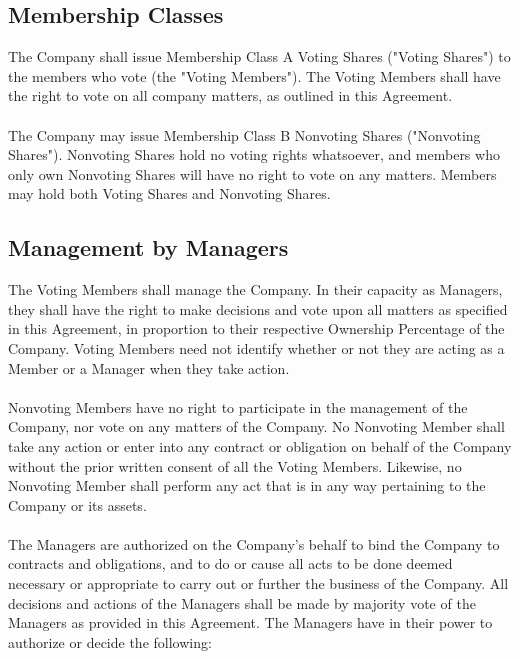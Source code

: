 \documentclass[11pt]{article}
\begin{document}
\subsection{Membership Classes}
\label{sec:membershipClasses}
The Company shall issue Membership Class A Voting Shares ("Voting Shares") to the members who vote (the "Voting Members"). The Voting Members shall have the right to vote on all company matters, as outlined in this Agreement.\\\\
The Company may issue Membership Class B Nonvoting Shares ("Nonvoting Shares"). Nonvoting Shares hold no voting rights whatsoever, and members who only own Nonvoting Shares will have no right to vote on any matters. Members may hold both Voting Shares and Nonvoting Shares.

\subsection{Management by Managers}
The Voting Members shall manage the Company. In their capacity as Managers, they shall have the right to make decisions and vote upon all matters as specified in this Agreement, in proportion to their respective Ownership Percentage of the Company. Voting Members need not identify whether or not they are acting as a Member or a Manager when they take action.\\\\
Nonvoting Members have no right to participate in the management of the Company, nor vote on any matters of the Company. No Nonvoting Member shall take any action or enter into any contract or obligation on behalf of the Company without the prior written consent of all the Voting Members. Likewise, no Nonvoting Member shall perform any act that is in any way pertaining to the Company or its assets.\\\\
The Managers are authorized on the Company's behalf to bind the Company to contracts and obligations, and to do or cause all acts to be done deemed necessary or appropriate to carry out or further the business of the Company. All decisions and actions of the Managers shall be made by majority vote of the Managers as provided in this Agreement. The Managers have in their power to authorize or decide the following:\\
\end{document}
